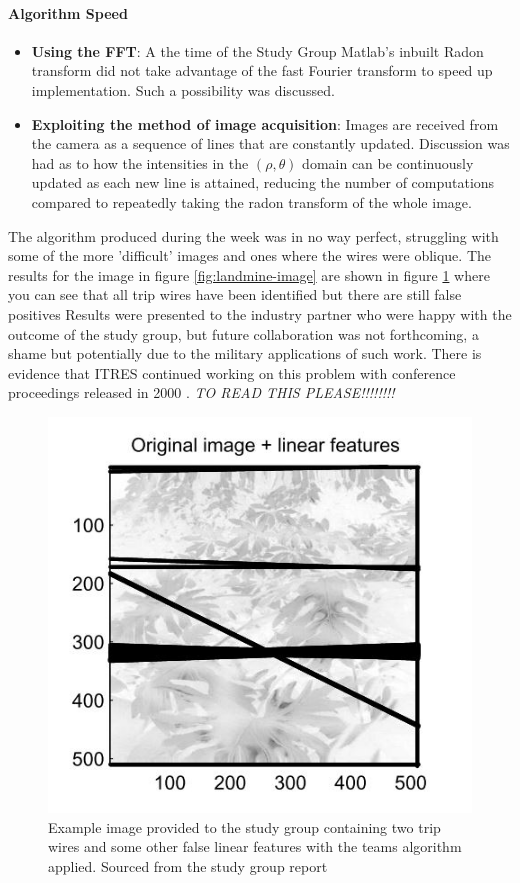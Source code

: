 \documentclass[11pt]{article} %
\begin{document}
	\paragraph{Algorithm Speed}
		\begin{itemize}
		\item \textbf{Using the FFT}: A the time of the Study Group Matlab's inbuilt Radon transform did not take advantage of the fast Fourier transform to speed up implementation. Such a possibility was discussed. 
		\item \textbf{Exploiting the method of image acquisition}: Images are received from the camera as a sequence of lines that are constantly updated. Discussion was had as to how the intensities in the $ (\rho, \theta)$ domain can be continuously updated as each new line is attained, reducing the number of computations compared to repeatedly taking the radon transform of the whole image. 
	\end{itemize}
	
	The algorithm produced during the week was in no way perfect, struggling with some of the more 'difficult' images and ones where the wires were oblique. The results for the image in figure \ref{fig:landmine-image} are shown in figure \ref{fig:landmine-linear-features}   where you can see that all trip wires have been identified but there are still false positives Results were presented to the industry partner who were happy with the outcome of the study group,  but future collaboration was not forthcoming, a shame but potentially due to the military applications of such work. There is evidence that ITRES continued working on this problem with conference proceedings released in 2000 \cite{Babey}. \emph{TO READ THIS PLEASE!!!!!!!!}
	
\begin{figure}
	\centering
	\includegraphics[width=0.7\linewidth]{"Report_images/landmine linear features"}
	\caption{Example image provided to the study group containing two trip wires and some other false linear features with the teams algorithm applied. Sourced from the study group report \cite{Jessop}}
	\label{fig:landmine-linear-features}
\end{figure}
\end{document}
